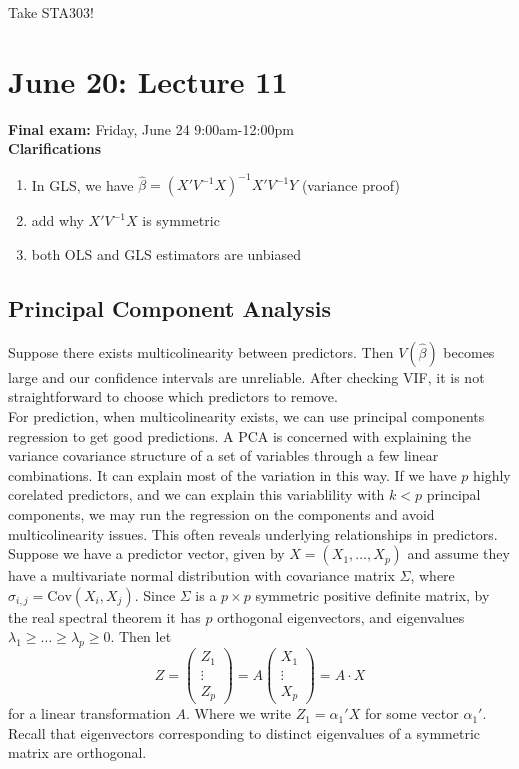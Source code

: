 \documentclass[12pt, a4paper]{article}
\theoremstyle{definition}
\newcommand{\lam}{\lambda}
\newcommand{\Cov}{\mathrm{Cov}}
\newcommand{\pmat}[1]{\begin{pmatrix}#1\end{pmatrix}}
\begin{document}
	Take STA303!
	
	\section{June 20: Lecture 11}
	
	{\bf Final exam:} Friday, June 24 9:00am-12:00pm\\
	
	{\bf Clarifications}
	\begin{enumerate}
		\item In GLS, we have $\hat \beta = (X'V^{-1}X)^{-1}X'V^{-1}Y$ (variance proof) 
		\item add why $X'V^{-1}X$ is symmetric
		\item both OLS and GLS estimators are unbiased 
	\end{enumerate}
	
	\subsection{Principal Component Analysis}
	
	Suppose there exists multicolinearity between predictors. Then $V(\hat \beta)$ becomes large and our confidence intervals are unreliable. After checking VIF, it is not straightforward to choose which predictors to remove. \\
	
	For prediction, when multicolinearity exists, we can use principal components regression to get good predictions. A PCA is concerned with explaining the variance covariance structure of a set of variables through a few linear combinations. It can explain most of the variation in this way. If we have $p$ highly corelated predictors, and we can explain this variablility with $k<p$ principal components, we may run the regression on the components and avoid multicolinearity issues. This often reveals underlying relationships in predictors.\\
	
	Suppose we have a predictor vector, given by $X = (X_1, \ldots, X_p)$ and assume they have a multivariate normal distribution with covariance matrix $\Sigma$, where $\sigma_{i,j} = \Cov(X_i, X_j)$. Since $\Sigma$ is a $p\times p$ symmetric positive definite matrix, by the real spectral theorem it has $p$ orthogonal eigenvectors, and eigenvalues $\lam_1 \geq \ldots \geq \lam_p \geq 0$. Then let 
	$$
	 Z = \pmat{Z_1 \\ \vdots \\ Z_p}  = A \pmat {X_1 \\ \vdots \\ X_p} =A \cdot X
	$$
	for a linear transformation $A$.
	Where we write $Z_1 = \alpha_1 ' X$ for some vector $\alpha_1'$. Recall that eigenvectors corresponding to distinct eigenvalues of a symmetric matrix are orthogonal. \\
	
\end{document}

